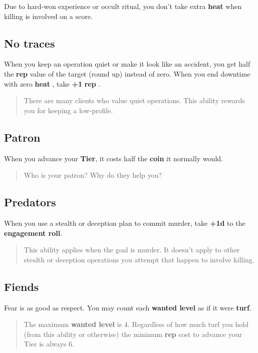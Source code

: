\documentclass[11pt,fleqn,a5paper]{book}
\newcommand{\gameterm}[1]{\textbf{#1}}
\begin{document}
Due to hard-won experience or occult ritual, you don’t take extra \gameterm{heat}  when killing is involved on a score.

\subsection{No traces}

When you keep an operation quiet or make it look like an accident, you get half the \gameterm{rep}  value of the target (round up) instead of zero. When you end downtime with zero \gameterm{heat} , take \textbf{+1} \gameterm{rep} .

\begin{quote}
	There are many clients who value quiet operations. This ability rewards you for keeping a low-profile.
\end{quote} 

\subsection{Patron}

When you advance your \textbf{Tier}, it costs half the \gameterm{coin}  it normally would.

\begin{quote}
	Who is your patron? Why do they help you?
\end{quote} 

\subsection{Predators}

When you use a stealth or deception plan to commit murder, take \textbf{+1d} to the \textbf{engagement roll}.

\begin{quote}
	This ability applies when the goal is murder. It doesn’t apply to other stealth or deception operations you attempt that happen to involve killing.
\end{quote} 

\subsection{Fiends}

Fear is as good as respect. You may count each \gameterm{wanted level}  as if it were \textbf{turf}.

\begin{quote}
	The maximum \gameterm{wanted level}  is 4. Regardless of how much turf you hold (from this ability or otherwise) the minimum \gameterm{rep}  cost to advance your Tier is always 6.
\end{quote} 
\end{document}
